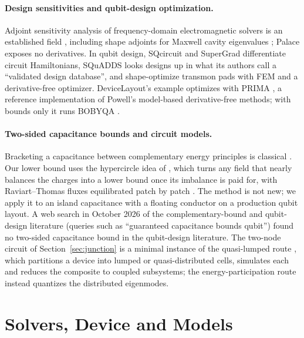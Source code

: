 \documentclass{anvil-paper}
\begin{document}
\paragraph{Design sensitivities and qubit-design optimization.}
Adjoint sensitivity analysis of frequency-domain electromagnetic solvers is
an established field \citep{nikolova2004adjoint}, including shape adjoints
for Maxwell cavity eigenvalues \citep{akcelik2005adjoint}; Palace exposes no
derivatives.
In qubit design, SQcircuit \citep{rajabzadeh2023analysis} and
SuperGrad \citep{wang2025supergrad} differentiate circuit Hamiltonians,
SQuADDS \citep{shanto2024squadds} looks designs up in what its authors
call a ``validated design database'', and \citet{eun2023shape} shape-optimize transmon pads with FEM
and a derivative-free optimizer.
DeviceLayout's example optimizes with PRIMA \citep{zhang2023prima}, a
reference implementation of Powell's model-based derivative-free methods;
with bounds only it runs BOBYQA \citep{powell2009bobyqa}.

\paragraph{Two-sided capacitance bounds and circuit models.}
Bracketing a capacitance between complementary energy principles is
classical \citep{specogna2011complementary}. Our lower bound uses the
hypercircle idea of \citet{prager1947approximations}, which turns any
field that nearly balances the charges into a lower bound once its
imbalance is paid for, with Raviart--Thomas
fluxes \citep{raviart1977mixed} equilibrated patch by patch
\citep{braess2007equilibrated,ern2015polynomial}. The method is not new; we
apply it to an island capacitance with a floating conductor on a
production qubit layout. A web search in October 2026 of the
complementary-bound and qubit-design literature (queries such as
``guaranteed capacitance bounds qubit'') found no two-sided capacitance
bound in the qubit-design literature. The two-node circuit of Section~\ref{sec:junction} is a minimal instance of
the quasi-lumped route \citep{minev2021circuit}, which partitions a device
into lumped or quasi-distributed cells, simulates each and reduces the
composite to coupled subsystems; the energy-participation route
\citep{minev2021energy} instead quantizes the distributed eigenmodes.

\section{Solvers, Device and Models}
\label{sec:setup}
\end{document}
